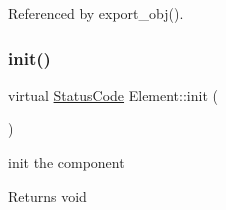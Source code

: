 Referenced by export\+\_\+obj().

\mbox{\label{classElement_af42754b5cabc198869222725218d695c}} 
\subsubsection{\texorpdfstring{init()}{init()}}
{\footnotesize\ttfamily virtual \hyperlink{classStatusCode}{Status\+Code} Element\+::init (\begin{DoxyParamCaption}{ }\end{DoxyParamCaption})\hspace{0.3cm}{\ttfamily [pure virtual]}}

init the component

\begin{DoxyReturn}{Returns}
void 
\end{DoxyReturn}


